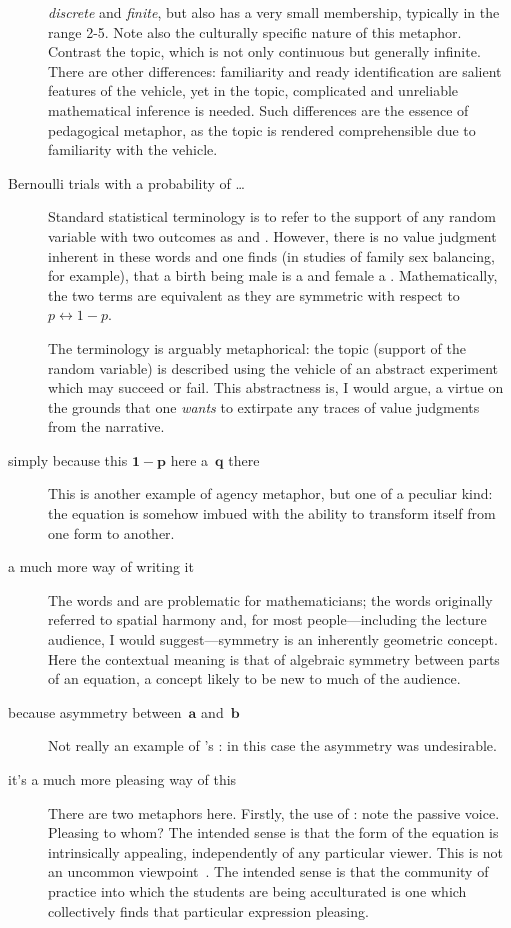 \begin{description}
{  \emph{discrete} and \emph{finite}, but also has a very small
  membership, typically in the range 2-5. Note also the culturally
  specific nature of this metaphor.  Contrast the topic, which is not
  only continuous but generally infinite.  There are other
  differences: familiarity and ready identification are salient
  features of the vehicle, yet in the topic, complicated and
  unreliable mathematical inference is needed.  Such differences are
  the essence of pedagogical metaphor, as the topic is rendered
  comprehensible due to familiarity with the vehicle.}
\item[Bernoulli trials with a probability of
  \metaphor{success}\ldots]{Standard statistical terminology is to
  refer to the support of any random variable with two outcomes as
   and .  However, there is no value
  judgment inherent in these words and one finds (in studies of
  family sex balancing, for example), that a birth being male is a
   and female a .  Mathematically, the
  two terms are equivalent as they are symmetric with respect
  to~$p\longleftrightarrow 1-p$.

  The terminology is arguably metaphorical: the topic (support of the
  random variable) is described using the vehicle of an abstract
  experiment which may succeed or fail.  This abstractness is, I would
  argue, a virtue on the grounds that one \emph{wants} to extirpate
  any traces of value judgments from the narrative.}

\item[simply because this $\mathbf{1-p}$ here \metaphor{turns into}
  a~$\mathbf{q}$ there]{This is another example of agency metaphor,
  but one of a peculiar kind: the equation is somehow imbued with the
  ability to transform itself from one form to another.}

\item[a much more \metaphor{symmetric} way of writing it]{The words
   and  are problematic for
  mathematicians; the words originally referred to spatial harmony
  and, for most people---including the lecture audience, I would
  suggest---symmetry is an inherently geometric concept.  Here the
  contextual meaning is that of algebraic symmetry between parts of an
  equation, a concept likely to be new to much of the audience.}
\item[because \metaphor{we have} asymmetry between~$\mathbf{a}$
  and~$\mathbf{b}$]{Not really an example of \citeauthor{pimm1984}'s
  : in this case the asymmetry was undesirable.}
\item[it's a much more pleasing way of \metaphor{handling} this]{There
  are two metaphors here.  Firstly, the use of : note
  the passive voice.  Pleasing to whom?  The intended sense is that
  the form of the equation is intrinsically appealing, independently
  of any particular viewer.  This is not an uncommon
  viewpoint~\citep{rota2011}.  The intended sense is that the
  community of practice into which the students are being acculturated
  is one which collectively finds that particular expression pleasing.

}
\end{description}
